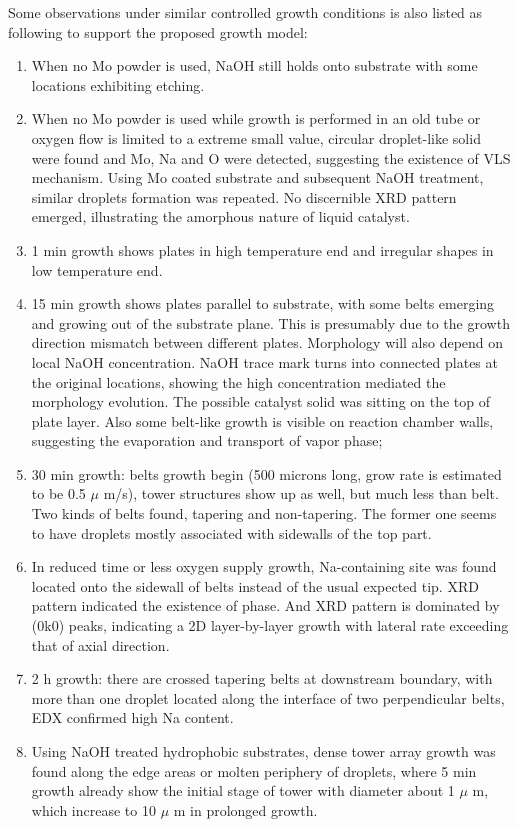 Some observations under similar controlled growth conditions is also listed as following to support the proposed growth model: 

\begin{enumerate}
\item When no Mo powder is used, NaOH still holds onto substrate with some locations exhibiting etching.
\item When no Mo powder is used while growth is performed in an old tube or oxygen flow is limited to a extreme small value, circular droplet-like solid were found and Mo, Na and O were detected, suggesting the existence of VLS mechanism. Using Mo coated substrate and subsequent NaOH treatment, similar droplets formation was repeated. No discernible XRD pattern emerged, illustrating the amorphous nature of liquid catalyst.
\item 1 min growth shows plates in high temperature end and irregular shapes in low temperature end.
\item 15 min growth shows  plates parallel to substrate, with some belts emerging and growing out of the substrate plane. This is presumably due to the growth direction mismatch between different plates. Morphology will also depend on local NaOH concentration. NaOH trace mark turns into connected plates at the original locations, showing the high concentration mediated the morphology evolution. The possible catalyst solid was sitting on the top of plate layer. Also some belt-like growth is visible on reaction chamber walls, suggesting the evaporation and transport of  vapor phase;
\item 30 min growth: belts growth begin (500 microns long, grow rate is estimated to be 0.5 $\mu$ m/s), tower structures show up as well, but much less than belt. Two kinds of belts found, tapering and non-tapering. The former one seems to have droplets mostly associated with sidewalls of the top part.
\item In reduced time or less oxygen supply growth, Na-containing site was found located onto the sidewall of belts instead of the usual expected tip. XRD pattern indicated the existence of  phase. And  XRD pattern is dominated by (0k0) peaks, indicating a 2D layer-by-layer growth with lateral rate exceeding that of axial direction.
\item 2 h growth: there are crossed tapering belts at downstream boundary, with more than one droplet located along the interface of two perpendicular belts, EDX confirmed high Na content.
\item Using NaOH treated hydrophobic substrates, dense tower array growth was found along the edge areas or molten periphery of droplets, where 5 min growth already show the initial stage of tower with diameter about 1 $\mu$ m, which increase to 10 $\mu$ m in prolonged growth.
\end{enumerate}

